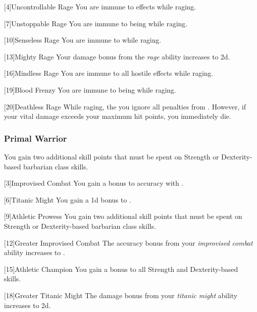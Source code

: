             [4]{Uncontrollable Rage}
            You are immune to  effects while raging.

            [7]{Unstoppable Rage}
            You are immune to being  while raging.

            [10]{Senseless Rage}
            You are immune to   while raging.

            [13]{Mighty Rage}
            Your damage bonus from the \textit{rage} ability increases to \plus2d.

            [16]{Mindless Rage} 
            You are immune to all hostile  effects while raging.

            [19]{Blood Frenzy} 
            You are immune to being  while raging.

            [20]{Deathless Rage} 
            While raging, the you ignore all penalties from .
            However, if your vital damage exceeds your maximum hit points, you immediately die.

        \subsubsection{Primal Warrior}
             You gain two additional skill points that must be spent on Strength or Dexterity-based barbarian class skills.

            [3]{Improvised Combat} You gain a  bonus to accuracy with .

            [6]{Titanic Might}
            You gain a \plus1d bonus to .

            [9]{Athletic Prowess} You gain two additional skill points that must be spent on Strength or Dexterity-based barbarian class skills.

            [12]{Greater Improvised Combat} 
            The accuracy bonus from your \textit{improvised combat} ability increases to .

            [15]{Athletic Champion}
            You gain a  bonus to all Strength and Dexterity-based skills.

            [18]{Greater Titanic Might}
            The damage bonus from your \textit{titanic might} ability increases to \plus2d.

